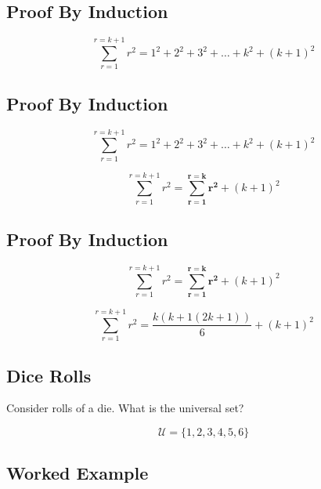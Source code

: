 \documentclass[]{report}
\begin{document}

\subsection{Proof By Induction}



\[ \sum_{r=1}^{r=k+1} r^2 = 1^2 + 2^2 + 3^2 + \ldots + k^2 + (k+1)^2 \]





\subsection{Proof By Induction}



\[ \sum_{r=1}^{r=k+1} r^2 = 1^2 + 2^2 + 3^2 + \ldots + k^2 + (k+1)^2 \]

\[ \sum_{r=1}^{r=k+1} r^2 = \boldsymbol{\sum_{r=1}^{r=k} r^2} + (k+1)^2 \]



\subsection{Proof By Induction}

\[ \sum_{r=1}^{r=k+1} r^2 = \boldsymbol{\sum_{r=1}^{r=k} r^2} + (k+1)^2 \]

\[ \sum_{r=1}^{r=k+1} r^2 = \frac{k(k+1(2k+1
))}{6} + (k+1)^2 \]



\subsection*{Dice Rolls}
Consider rolls of a die. What is the universal set?

\[ \mathcal{U} = \{1,2,3,4,5,6\} \]

\subsection*{Worked Example}
\end{document}
